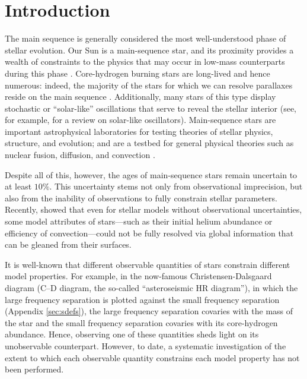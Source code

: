 

\section{Introduction} 

The main sequence is generally considered the most well-understood phase of stellar evolution. 
Our Sun is a main-sequence star, and its proximity provides a wealth of constraints to the physics that may occur in low-mass counterparts during this phase \citep[e.g.,][]{2015SSRv..196...49B,2016lrsp...13....2b}. 
Core-hydrogen burning stars are long-lived and hence numerous: indeed, the majority of the stars for which we can resolve parallaxes reside on the main sequence \citep{2016arXiv160904172G}. 
Additionally, many stars of this type display stochastic or ``solar-like'' oscillations that serve to reveal the stellar interior (see, for example, \citealt{2013ARA&A..51..353C} for a review on solar-like oscillators).  
Main-sequence stars are important astrophysical laboratories for testing theories of stellar physics, structure, and evolution; and are a testbed for general physical theories such as nuclear fusion, diffusion, and convection \citep[e.g.,][]{1994MNRAS.269.1137B,1990ARAA..28..263S}. 

Despite all of this, however, the ages of main-sequence stars remain uncertain to at least  $10\%$. This uncertainty stems not only from observational imprecision, but also from the inability of observations to fully constrain stellar parameters.  
Recently,  showed that even for stellar models without observational uncertainties, some model attributes of stars---such as their initial helium abundance or efficiency of convection---could not be fully resolved via global information that can be gleaned from their surfaces. 


It is well-known that different observable quantities of stars constrain different model properties. For example, in the now-famous Christensen-Dalsgaard diagram (C--D diagram, the so-called ``asteroseismic HR diagram''), in which the large frequency separation is plotted against the small frequency separation (Appendix \ref{sec:sdefs}), the large frequency separation covaries with the mass of the star and the small frequency separation covaries with its core-hydrogen abundance. Hence, observing one of these quantities sheds light on its unobservable counterpart.
However, to date, a systematic investigation of the extent to which each observable quantity constrains each model property has not been performed.

